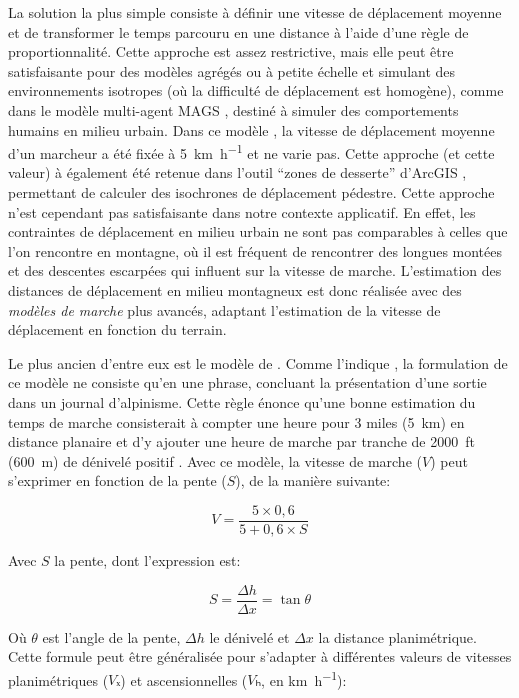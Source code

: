 La solution la plus simple consiste à définir une vitesse de
déplacement moyenne et de transformer le temps parcouru en une
distance à l'aide d'une règle de proportionnalité. Cette approche est
assez restrictive, mais elle peut être satisfaisante pour des modèles
agrégés ou à petite échelle et simulant des environnements isotropes
(où la difficulté de déplacement est homogène), comme dans le modèle
multi-agent MAGS \autocite{Moulin2003}, destiné à simuler des
comportements humains en milieu urbain. Dans ce modèle
\autocite{Moulin2003}, la vitesse de déplacement moyenne d'un marcheur
a été fixée à \SI{5}{\kilo\meter\per\hour} et ne varie pas. Cette
approche (et cette valeur) à également été retenue dans l'outil
\enquote{zones de desserte} d'ArcGIS \autocite{ESRI2020}, permettant
de calculer des isochrones de déplacement pédestre. Cette approche
n'est cependant pas satisfaisante dans notre contexte applicatif. En
effet, les contraintes de déplacement en milieu urbain ne sont pas
comparables à celles que l'on rencontre en montagne, où il est
fréquent de rencontrer des longues montées et des descentes escarpées
qui influent sur la vitesse de marche. L'estimation des distances de
déplacement en milieu montagneux est donc réalisée avec des
\emph{modèles de marche} plus avancés, adaptant l'estimation de la
vitesse de déplacement en fonction du terrain.

Le plus ancien d'entre eux est le modèle de
\textcite{Naismith1892}. Comme l'indique \textcite{Duchene2019}, la
formulation de ce modèle ne consiste qu'en une phrase, concluant la
présentation d'une sortie dans un journal d'alpinisme. Cette règle
énonce qu'une bonne estimation du temps de marche consisterait à
compter une heure pour 3 miles (\SI{5}{\kilo\meter}) en distance
planaire et d'y ajouter une heure de marche par tranche de
\SI{2000}{ft} (\SI{600}{\meter}) de dénivelé positif
\autocite{Naismith1892}. Avec ce modèle, la vitesse de marche (\(V\))
peut s'exprimer en fonction de la pente (\(S\)), de la manière
suivante:

\begin{equation}
  \label{eq:marche_naismith}
  V = \dfrac{5 × 0,6}{5 + 0,6 × S}
\end{equation}

Avec \(S\) la pente, dont l'expression est:

\begin{equation}
 S = \dfrac{Δh}{Δx} = \tan θ
\end{equation}

Où \(θ\) est l'angle de la pente, \(Δh\) le dénivelé et \(Δx\) la
distance planimétrique. Cette formule peut être généralisée pour
s'adapter à différentes valeurs de vitesses planimétriques (\(Vₓ\)) et
ascensionnelles (\(Vₕ\), en \si{\kilo\meter\per\hour}):

